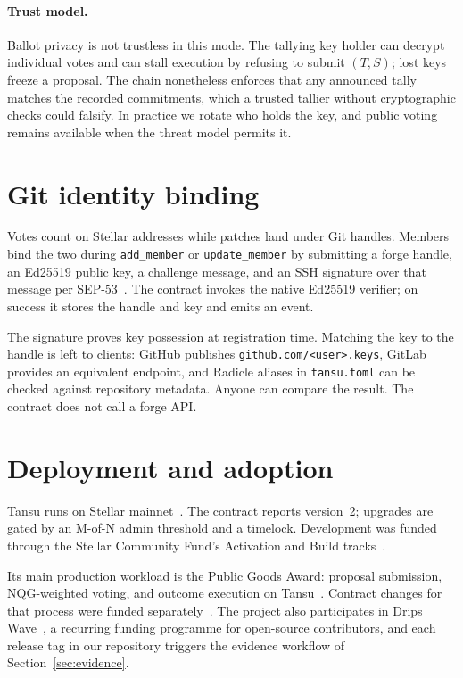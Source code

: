 \documentclass[11pt]{article}
\newcommand{\tansu}{Tansu}
\begin{document}
\paragraph{Trust model.}
Ballot privacy is not trustless in this mode. The tallying key holder can
decrypt individual votes and can stall execution by refusing to submit
$(T,S)$; lost keys freeze a proposal. The chain nonetheless enforces that any
announced tally matches the recorded commitments, which a trusted tallier
without cryptographic checks could falsify. In practice we rotate who holds
the key, and public voting remains available when the threat model permits it.

\section{Git identity binding}
\label{sec:identity}

Votes count on Stellar addresses while patches land under Git handles. Members
bind the two during \texttt{add\_member} or \texttt{update\_member} by
submitting a forge handle, an Ed25519 public key, a challenge message, and an
SSH signature over that message per SEP-53~\citep{sep53}. The contract invokes
the native Ed25519 verifier; on success it stores the handle and key and emits
an event.

The signature proves key possession at registration time. Matching the key to
the handle is left to clients: GitHub publishes
\texttt{github.com/\textless{}user\textgreater{}.keys}, GitLab provides an
equivalent endpoint, and Radicle aliases in \texttt{tansu.toml} can be checked
against repository metadata. Anyone can compare the result. The contract does not
call a forge API.

\section{Deployment and adoption}
\label{sec:deployment}

\tansu{} runs on Stellar mainnet~\citep{stellar_expert_tansu}. The contract
reports version~2; upgrades are gated by an M-of-N admin threshold and a
timelock. Development was funded through the Stellar Community Fund's
Activation and Build tracks~\citep{scf_rec_activation, scf_rec_build}.

Its main production workload is the Public Goods Award: proposal submission,
NQG-weighted voting, and outcome execution on
\tansu{}~\citep{pg_award_overview,pg_award_tansu_mods,pg_award_proposer}.
Contract changes for that process were funded
separately~\citep{scf_rec_pg}. The project also participates in Drips
Wave~\citep{drips_wave_docs}, a recurring funding programme for open-source
contributors, and each release tag in our repository triggers the evidence
workflow of Section~\ref{sec:evidence}.
\end{document}
